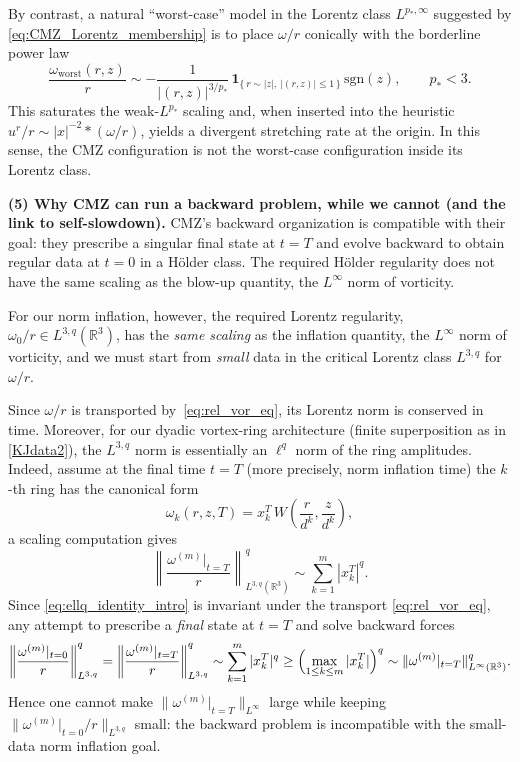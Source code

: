 \documentclass[reqno,11pt]{amsart}
\begin{document}
By contrast, a natural ``worst-case'' model in the Lorentz class $L^{p_\ast,\infty}$ suggested by
\eqref{eq:CMZ_Lorentz_membership} is to place $\omega/r$ conically with the borderline power law
\begin{equation*}
\frac{\omega_{\mathrm{worst}}(r,z)}{r}
\sim
-\frac{1}{|(r,z)|^{3/p_\ast}}\,
\mathbf{1}_{\{\,r\sim |z|,\ |(r,z)|\le 1\,\}}\,
\mathrm{sgn}(z),
\qquad p_\ast<3.
\end{equation*}
This saturates the weak-$L^{p_\ast}$ scaling and, when inserted into the heuristic
$u^r/r\sim |x|^{-2}*(\omega/r)$, yields a divergent stretching rate at the origin.
In this sense, the CMZ configuration is not the worst-case configuration inside its Lorentz class.

\medskip
\noindent\textbf{(5) Why CMZ can run a backward problem, while we cannot (and the link to self-slowdown).} 
CMZ's backward organization is compatible with their goal: they prescribe a singular final
state at $t=T$ and evolve backward to obtain regular data at $t=0$ in a H\"older class. The required H\"older regularity does not have the same scaling as the blow-up quantity, the $L^\infty$ norm of vorticity.

For our norm inflation, however, the required Lorentz regularity, $\omega_0/r \in L^{3,q}(\mathbb{R}^3)$, has the \emph{same scaling} as the inflation quantity, the $L^\infty$ norm of vorticity, and 
we must start from \emph{small} data in the critical Lorentz
class $L^{3,q}$ for $\omega/r$.  

Since $\omega/r$ is transported by~\eqref{eq:rel_vor_eq}, its Lorentz norm is
conserved in time.  Moreover, for our dyadic vortex-ring architecture (finite superposition
as in \eqref{KJdata2}), the $L^{3,q}$ norm is essentially an $\ell^q$ norm of the ring amplitudes.
Indeed, 
assume
at the final time $t=T$ (more precisely, norm inflation time) the $k$-th ring has the canonical form
\[
\omega_k(r,z,T)=x_k^T\,W\!\left(\frac{r}{d^k},\frac{z}{d^k}\right),
\]
a scaling computation gives
\begin{equation}\label{eq:ellq_identity_intro}
\left\|\frac{\omega^{(m)}|_{t=T}}{r}\right\|_{L^{3,q}(\mathbb{R}^3)}^{q}
\sim \sum_{k=1}^{m}|x_k^T|^{q}.
\end{equation}
Since \eqref{eq:ellq_identity_intro} is invariant under the transport \eqref{eq:rel_vor_eq},
any attempt to prescribe a \emph{final} state at $t=T$ and solve backward forces
\[
\left\|\frac{\omega^{(m)}|_{t=0}}{r}\right\|_{L^{3,q}}^{q}
=
\left\|\frac{\omega^{(m)}|_{t=T}}{r}\right\|_{L^{3,q}}^{q}
\sim \sum_{k=1}^{m}|x_k^T|^{q}
\ge \Bigl(\max_{1\le k\le m}|x_k^T|\Bigr)^q
\sim \|\omega^{(m)}|_{t=T}\|_{L^\infty(\mathbb{R}^3)}^{q}.
\]
Hence one cannot make $\|\omega^{(m)}|_{t=T}\|_{L^\infty}$ large while keeping
$\|\omega^{(m)}|_{t=0}/r\|_{L^{3,q}}$ small: the backward problem is incompatible with the
small-data norm inflation goal.
\end{document}
